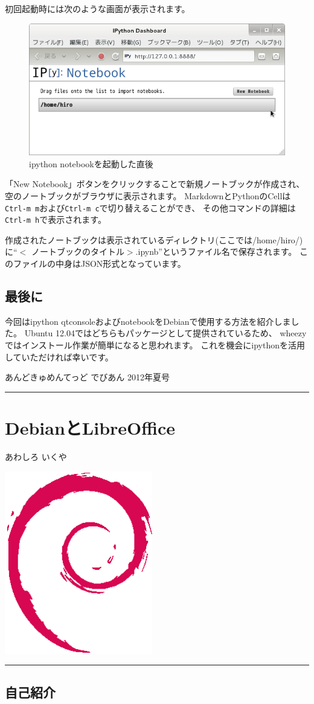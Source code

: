 \documentclass[mingoth,a4paper]{jsarticle}
\renewcommand{\dancersection}[2]{%
\newpage
あんどきゅめんてっど でびあん 2012年夏号
%
\vspace{0.1mm}\\
{\color{dancerdarkblue}\rule{\hsize}{2mm}}

%
%
\begin{minipage}[t]{0.6\hsize}
\color{dancerdarkblue}
\vspace{1cm}
\section{#1}
\hfill{}#2\\
\end{minipage}
\begin{minipage}[t]{0.4\hsize}
\vspace{-2cm}
\hfill{}\includegraphics[height=8cm]{image200502/openlogo-nd.eps}\\
\vspace{-5cm}
\end{minipage}
%
{\color{dancerlightblue}\rule{0.66\hsize}{2mm}}
%
\vspace{2cm}
}
\begin{document}

初回起動時には次のような画面が表示されます。

\begin{figure}[ht]
  \begin{center}
    \includegraphics[width=0.67\hsize]{image2012-gum/ipython-notebook.png}
  \end{center}
  \caption{ipython notebookを起動した直後}
  \label{fig:ipython-notebook}
\end{figure}

「New Notebook」ボタンをクリックすることで新規ノートブックが作成され、
空のノートブックがブラウザに表示されます。
MarkdownとPythonのCellは\texttt{Ctrl-m m}および\texttt{Ctrl-m c}で切り替えることができ、
その他コマンドの詳細は\texttt{Ctrl-m h}で表示されます。

作成されたノートブックは表示されているディレクトリ(ここでは/home/hiro/)に``$<$ ノートブックのタイトル$>$.ipynb''というファイル名で保存されます。
このファイルの中身はJSON形式となっています。

\subsection{最後に}

今回はipython qtconsoleおよびnotebookをDebianで使用する方法を紹介しました。
Ubuntu 12.04ではどちらもパッケージとして提供されているため、
wheezyではインストール作業が簡単になると思われます。
これを機会にipythonを活用していただければ幸いです。


\dancersection{DebianとLibreOffice}{あわしろ いくや}
\label{sec:libreoffice}

\subsection{自己紹介}
\end{document}
